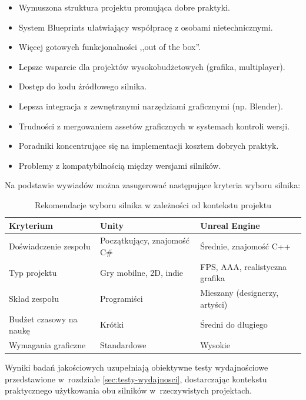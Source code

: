 \begin{itemize}
    \item Wymuszona struktura projektu promująca dobre praktyki.
    \item System Blueprints ułatwiający współpracę z osobami nietechnicznymi.
    \item Więcej gotowych funkcjonalności ,,out of the box''.
    \item Lepsze wsparcie dla projektów wysokobudżetowych (grafika, multiplayer).
    \item Dostęp do kodu źródłowego silnika.
    \item Lepsza integracja z zewnętrznymi narzędziami graficznymi (np. Blender).
\end{itemize}

\begin{itemize}
    \item Trudności z mergowaniem assetów graficznych w systemach kontroli wersji.
    \item Poradniki koncentrujące się na implementacji kosztem dobrych praktyk.
    \item Problemy z kompatybilnością między wersjami silników.
\end{itemize}

Na podstawie wywiadów można zasugerować następujące kryteria wyboru silnika:

\begin{table}[H]
\centering
\caption{Rekomendacje wyboru silnika w zależności od kontekstu projektu}
\label{tab:rekomendacje-silnikow}
\begin{tabular}{|>{\raggedright\arraybackslash}p{4.5cm}|>{\raggedright\arraybackslash}p{4cm}|>{\raggedright\arraybackslash}p{4cm}|}
\hline
\textbf{Kryterium} & \textbf{Unity} & \textbf{Unreal Engine} \\
\hline
Doświadczenie zespołu & Początkujący, znajomość C\# & Średnie, znajomość C++ \\
\hline
Typ projektu & Gry mobilne, 2D, indie & FPS, AAA, realistyczna grafika \\
\hline
Skład zespołu & Programiści & Mieszany (designerzy, artyści) \\
\hline
Budżet czasowy na naukę & Krótki & Średni do długiego \\
\hline
Wymagania graficzne & Standardowe & Wysokie \\
\hline
\end{tabular}
\end{table}

Wyniki badań jakościowych uzupełniają obiektywne testy wydajnościowe
przedstawione w~rozdziale \ref{sec:testy-wydajnosci}, dostarczając
kontekstu praktycznego użytkowania obu silników w~rzeczywistych projektach.
